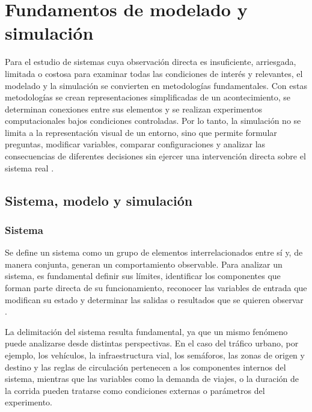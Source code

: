 
\section{Fundamentos de modelado y simulación}
\label{subsec:fundamentos_modelado_simulacion}

Para el estudio de sistemas cuya observación directa es insuficiente, arriesgada, limitada o costosa para examinar todas las condiciones de interés y relevantes, el modelado y la simulación se convierten en metodologías fundamentales. Con estas metodologías se crean representaciones simplificadas de un acontecimiento, se determinan conexiones entre sus elementos y se realizan experimentos computacionales bajos condiciones controladas. Por lo tanto, la simulación no se limita a la representación visual de un entorno, sino que permite formular preguntas, modificar variables, comparar configuraciones y analizar las consecuencias de diferentes decisiones sin ejercer una intervención directa sobre el sistema real \cite{bungartz2014modeling,law2015simulation}. 

\subsection{Sistema, modelo y simulación}
\label{subsubsec:sistema_modelo_simulacion}

\subsubsection{Sistema}

Se define un sistema como un grupo de elementos interrelacionados entre sí y, de manera conjunta, generan un comportamiento observable. Para analizar un sistema, es fundamental definir sus límites, identificar los componentes que forman parte directa de su funcionamiento, reconocer las variables de entrada que modifican su estado y determinar las salidas o resultados que se quieren observar \cite{bungartz2014modeling, law2015simulation}. 

La delimitación del sistema resulta fundamental, ya que un mismo fenómeno puede analizarse desde distintas perspectivas. En el caso del tráfico urbano, por ejemplo, los vehículos, la infraestructura vial, los semáforos, las zonas de origen y destino y las reglas de circulación pertenecen a los componentes internos del sistema, mientras que las variables como la demanda de viajes, o la duración de la corrida pueden tratarse como condiciones externas o parámetros del experimento.

